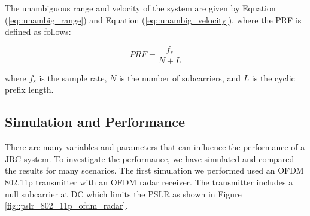 \documentclass[conference]{IEEEtran}
\begin{document}
  	  	The unambiguous range and velocity of the system are given by Equation (\ref{eq::unambig_range}) and Equation (\ref{eq::unambig_velocity}), where the PRF is defined as follows:
  	  	
  	  	\begin{equation}
  	  		PRF = \frac{f_s}{N + L}
  	  	\end{equation}
  	  	
  	  	where $f_s$ is the sample rate, $N$ is the number of subcarriers, and $L$ is the cyclic prefix length.
  	  	

\subsection {Simulation and Performance}
      
There are many variables and parameters that can influence the performance of a JRC system. To investigate the performance, we have simulated and compared the results for many scenarios. The first simulation we performed used an OFDM 802.11p transmitter with an OFDM radar receiver. The transmitter includes a null subcarrier at DC which limits the PSLR as shown in Figure \ref{fig::pslr_802_11p_ofdm_radar}.
\end{document}
